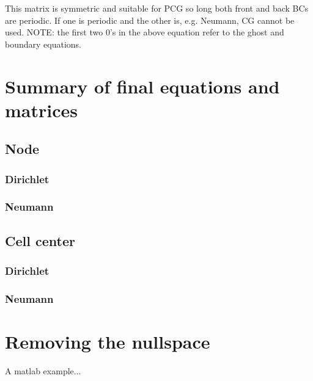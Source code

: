 \documentclass[landscape]{article}
\begin{document}
This matrix is symmetric and suitable for PCG so long both front and back BCs are periodic. If one is periodic and the other is, e.g. Neumann, CG cannot be used. NOTE: the first two 0's in the above equation refer to the ghost and boundary equations.

\newpage

\section{Summary of final equations and matrices}
\subsection{Node}
\subsubsection{Dirichlet}
\subsubsection{Neumann}
\subsection{Cell center}
\subsubsection{Dirichlet}
\subsubsection{Neumann}

\newpage
\section{Removing the nullspace}
A matlab example...
\end{document}

